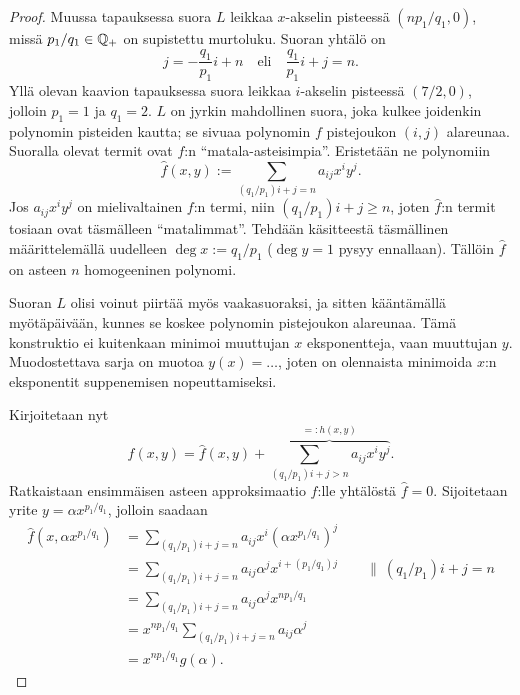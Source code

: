 \begin{proof}
    Muussa tapauksessa suora $L$ leikkaa $x$-akselin pisteessä $(np_1/q_1,0)$, missä $p_1/q_1\in\mathbb{Q}_+$ on supistettu murtoluku. Suoran yhtälö on
    \begin{equation*}
        j=-\frac{q_1}{p_1}i+n \quad \text{eli} \quad \frac{q_1}{p_1}i+j=n.
    \end{equation*}
    Yllä olevan kaavion tapauksessa suora leikkaa $i$-akselin pisteessä $(7/2,0)$, jolloin $p_1=1$ ja $q_1=2$. $L$ on jyrkin mahdollinen suora, joka kulkee joidenkin polynomin pisteiden kautta; se sivuaa polynomin $f$ pistejoukon $(i,j)$ alareunaa. Suoralla olevat termit ovat $f$:n ``matala-asteisimpia''. Eristetään ne polynomiin
    \begin{equation*}
        \widehat f(x,y):=\sum_{(q_1/p_1)i+j=n}a_{ij}x^iy^j.
    \end{equation*}
    Jos $a_{ij}x^iy^j$ on mielivaltainen $f$:n termi, niin $(q_1/p_1)i+j\geq n$, joten $\widehat f$:n termit tosiaan ovat täsmälleen ``matalimmat''. Tehdään käsitteestä täsmällinen määrittelemällä uudelleen $\deg x:=q_1/p_1$ ($\deg y=1$ pysyy ennallaan). Tällöin $\widehat f$ on asteen $n$ homogeeninen polynomi.
    \begin{huomautus}
        Suoran $L$ olisi voinut piirtää myös vaakasuoraksi, ja sitten kääntämällä myötäpäivään, kunnes se koskee polynomin pistejoukon alareunaa. Tämä konstruktio ei kuitenkaan minimoi muuttujan $x$ eksponentteja, vaan muuttujan $y$. Muodostettava sarja on muotoa $y(x)=\dots$, joten on olennaista minimoida $x$:n eksponentit suppenemisen nopeuttamiseksi.
    \end{huomautus}
    Kirjoitetaan nyt
    \begin{equation*}
        f(x,y) = \widehat f(x,y) + \overbrace{\sum_{(q_1/p_1)i+j>n}a_{ij}x^iy^j}^{=:h(x,y)}.
    \end{equation*}
    Ratkaistaan ensimmäisen asteen approksimaatio $f$:lle yhtälöstä $\widehat f=0$. Sijoitetaan yrite $y=\alpha x^{p_1/q_1}$, jolloin saadaan
    \begin{align*}
        \widehat f(x,\alpha x^{p_1/q_1})&=\sum_{(q_1/p_1)i+j=n}a_{ij}x^i(\alpha x^{p_1/q_1})^j \\
        &=\sum_{(q_1/p_1)i+j=n}a_{ij}\alpha^jx^{i+(p_1/q_1)j} \qquad \|\ (q_1/p_1)i+j=n \\
        &=\sum_{(q_1/p_1)i+j=n}a_{ij}\alpha^jx^{np_1/q_1} \\
        &=x^{np_1/q_1}\sum_{(q_1/p_1)i+j=n}a_{ij}\alpha^j \\
        &=x^{np_1/q_1}g(\alpha).
    \end{align*}

\end{proof}
